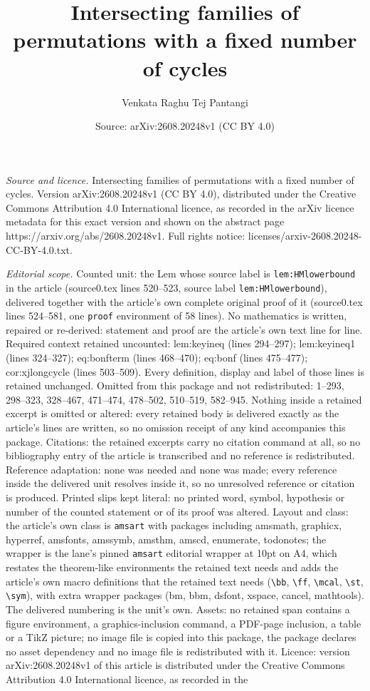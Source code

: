 \documentclass[10pt,a4paper]{amsart}
\title[Intersecting families of permutations with a fixed number of]{Intersecting families of permutations with a fixed number of cycles}
\author{Venkata Raghu Tej Pantangi}
\date{Source: arXiv:2608.20248v1 (CC BY 4.0)}
\begin{document}
\maketitle

\noindent\emph{Source and licence.} Intersecting families of permutations with a fixed number of cycles. Version arXiv:2608.20248v1 (CC BY 4.0), distributed under the Creative Commons Attribution 4.0 International licence, as recorded in the arXiv licence metadata for this exact version and shown on the abstract page https://arxiv.org/abs/2608.20248v1. Full rights notice: licenses/arxiv-2608.20248-CC-BY-4.0.txt.\par\smallskip

\noindent\textit{Editorial scope.} Counted unit: the Lem whose source label is \texttt{lem:HMlowerbound} in the article (source0.tex lines 520--523, source label \texttt{lem:HMlowerbound}), delivered together with the article's own complete original proof of it (source0.tex lines 524--581, one \texttt{proof} environment of 58 lines). No mathematics is written, repaired or re-derived: statement and proof are the article's own text line for line. Required context retained uncounted: lem:keyineq (lines 294--297); lem:keyineq1 (lines 324--327); eq:bonfterm (lines 468--470); eq:bonf (lines 475--477); cor:xjlongcycle (lines 503--509). Every definition, display and label of those lines is retained unchanged. Omitted from this package and not redistributed: 1--293, 298--323, 328--467, 471--474, 478--502, 510--519, 582--945. Nothing inside a retained excerpt is omitted or altered: every retained body is delivered exactly as the article's lines are written, so no omission receipt of any kind accompanies this package. Citations: the retained excerpts carry no citation command at all, so no bibliography entry of the article is transcribed and no reference is redistributed. Reference adaptation: none was needed and none was made; every reference inside the delivered unit resolves inside it, so no unresolved reference or citation is produced. Printed slips kept literal: no printed word, symbol, hypothesis or number of the counted statement or of its proof was altered. Layout and class: the article's own class is \texttt{amsart} with packages including amsmath, graphicx, hyperref, amsfonts, amssymb, amsthm, amscd, enumerate, todonotes; the wrapper is the lane's pinned \texttt{amsart} editorial wrapper at 10pt on A4, which restates the theorem-like environments the retained text needs and adds the article's own macro definitions that the retained text needs (\texttt{\textbackslash bb}, \texttt{\textbackslash ff}, \texttt{\textbackslash mcal}, \texttt{\textbackslash st}, \texttt{\textbackslash sym}), with extra wrapper packages (bm, bbm, dsfont, xspace, cancel, mathtools). The delivered numbering is the unit's own. Assets: no retained span contains a figure environment, a graphics-inclusion command, a PDF-page inclusion, a table or a TikZ picture; no image file is copied into this package, the package declares no asset dependency and no image file is redistributed with it. Licence: version arXiv:2608.20248v1 of this article is distributed under the Creative Commons Attribution 4.0 International licence, as recorded in the 
\end{document}
